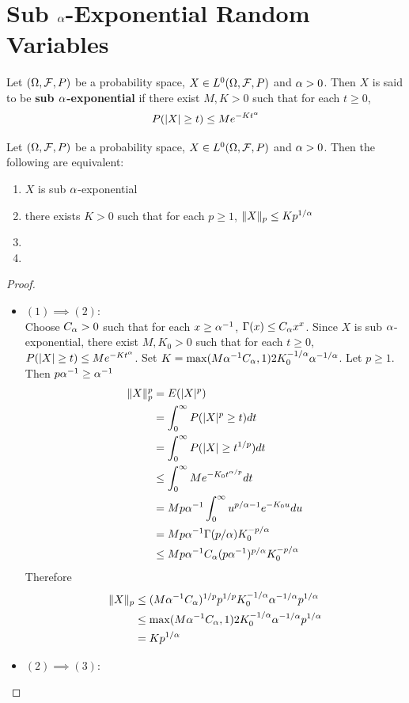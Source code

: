 \documentclass{book}
\begin{document}
	
	
	\section{Sub $\alpha$-Exponential Random Variables}
	
	\begin{defn}
		Let $(\Omega, \mathcal{F}, P)$ be a probability space, $X \in L^0(\Omega, \mathcal{F}, P)$ and $\alpha >0$. Then $X$ is said to be \textbf{sub $\alpha$-exponential} if there exist $M, K > 0$ such that for each $t \geq 0$, $$P(|X| \geq t) \leq Me^{-Kt^{\alpha}}$$
	\end{defn}
	
	\begin{ex}
		Let $(\Omega, \mathcal{F}, P)$ be a probability space, $X \in L^0(\Omega, \mathcal{F}, P)$ and $\alpha > 0$. Then the following are equivalent:
		\begin{enumerate}
			\item $X$ is sub $\alpha$-exponential
			\item there exists $K > 0$ such that for each $p \geq 1$, $\|X\|_p \leq K p^{1/\alpha}$ 
			\item 
			\item 
		\end{enumerate} 
	\end{ex}

	\begin{proof}\
		\begin{itemize}
			\item $(1) \implies (2)$: \\
			Choose $C_{\alpha} > 0$ such that for each $x \geq \alpha^{-1}$, $\Gamma(x) \leq C_{\alpha} x^x$. Since $X$ is sub $\alpha$-exponential, there exist $M, K_0 >0$ such that for each $t \geq 0$, $P(|X| \geq t) \leq Me^{-Kt^{\alpha}}$. Set $K = \max(M\alpha^{-1}C_{\alpha}, 1) 2 K_0^{-1/\alpha} \alpha^{-1/\alpha}$. Let $p \geq 1$. Then $p \alpha^{-1} \geq \alpha^{-1}$
			\begin{align*}
				\|X\|_p^p 
				&= E(|X|^p) \\
				&= \int_0^{\infty} P(|X|^p \geq t)dt \\
				&= \int_0^{\infty} P(|X| \geq t^{1/p})dt \\
				& \leq \int_0^{\infty} M e^{-K_0 t^{\alpha / p}}dt \\
				&= Mp \alpha^{-1} \int_0^{\infty} u^{p/\alpha - 1} e^{-K_0 u} du \\
				&=  Mp \alpha^{-1} \Gamma(p / \alpha)K_0^{-p/\alpha} \\
				& \leq Mp \alpha^{-1} C_{\alpha} (p \alpha^{-1})^{p  /\alpha}K_0^{-p/\alpha} \\
			\end{align*} 
		Therefore 
		\begin{align*}
			\|X\|_p 
			& \leq (M\alpha^{-1}C_{\alpha})^{1/p} p^{1/p} K_0^{-1/\alpha} \alpha^{-1/\alpha} p^{1/\alpha}  \\
			& \leq \max(M\alpha^{-1}C_{\alpha}, 1) 2 K_0^{-1/\alpha} \alpha^{-1/\alpha} p^{1/\alpha} \\
			&= K p^{1/\alpha} 
		\end{align*}
			\item $(2) \implies (3)$: \\
			
		\end{itemize}
	\end{proof}
	
\end{document}
